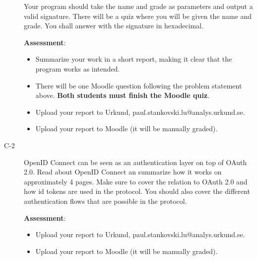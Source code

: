 \documentclass{article}
\begin{document}
\begin{description}
{    Your program should take the name and grade as parameters and output a valid signature.
    There will be a quiz where you will be given the name and grade. You shall answer with the
    signature in hexadecimal.

    \textbf{Assessment}:
	\begin{itemize}
		\item Summarize your work in a short report, making it clear that the program works as intended.
        
        \item There will be one Moodle question following the problem statement above. 
        \textbf{Both students must finish the Moodle quiz}.
        
		\item Upload your report to Urkund, paul.stankovski.lu@analys.urkund.se.
        
		\item Upload your report to Moodle (it will be manually graded).
	\end{itemize}
	}

	\item[C-2]{OpenID Connect can be seen as an authentication layer on top of OAuth 2.0. Read about OpenID Connect an summarize how it works on approximately 4 pages. Make sure to cover the relation to OAuth 2.0 and how id tokens are used in the protocol. You should also cover the different authentication flows that are possible in the protocol.

	\textbf{Assessment}:
	\begin{itemize}
		\item Upload your report to Urkund, paul.stankovski.lu@analys.urkund.se.
		\item Upload your report to Moodle (it will be manually graded).
	\end{itemize}
	}
\end{description}
\end{document}
